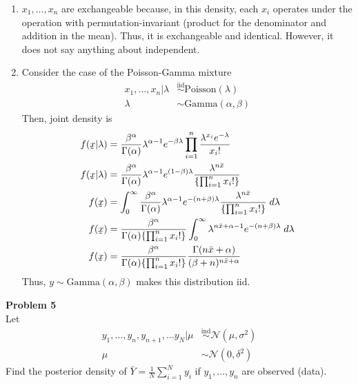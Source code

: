 \documentclass{article}
\newcommand{\ut}[1]{\underaccent{\tilde}{#1}}
\renewcommand{\vec}[1]{\ut{#1}}
\newcommand{\ind}{\stackrel{\text{ind}}{\sim}}
\newcommand{\iid}{\stackrel{\text{iid}}{\sim}}
\newcommand{\nx}{x_1,\dots,x_n}
\newcommand{\ny}{y_1,\dots,y_n}
\newcommand{\Done}[2]{\text{#1}\left({#2}\right)}
\newcommand{\Dtwo}[3]{\text{#1}\left({#2},{#3}\right)}
\begin{document}
\begin{enumerate}
    \item $\nx$ are exchangeable because, in this density, each $x_i$ operates under the operation with permutation-invariant (product for the denominator and addition in the mean). Thus, it is exchangeable and identical. However, it does not say anything about independent.
    \item Consider the case of the Poisson-Gamma mixture
    \begin{align*}
    \nx | \lambda &\iid \Done{Poisson}{\lambda}\\
    \lambda &\sim \Dtwo{Gamma}{\alpha}{\beta}
    \end{align*}
    Then, joint density is
    \begin{align*}
        f(\vec{x}|\lambda) &= \frac{\beta^{\alpha}}{\Gamma(\alpha)}\lambda^{\alpha -1}e^{-\beta \lambda} \prod_{i=1}^n \frac{\lambda^{x_i}e^{-\lambda}}{x_i!}\\
        f(\vec{x}|\lambda) &= \frac{\beta^{\alpha}}{\Gamma(\alpha)}\lambda^{\alpha -1}e^{(1-\beta)\lambda}\frac{\lambda^{n\bar{x}}}{\{\prod_{i=1}^n x_i!\}}\\
        f(\vec{x}) &= \int_{0}^{\infty} \frac{\beta^{\alpha}}{\Gamma(\alpha)}\lambda^{\alpha -1}e^{-(n+\beta)\lambda}\frac{\lambda^{n\bar{x}}}{\{\prod_{i=1}^n x_i!\}} \; d\lambda\\
        f(\vec{x}) &=  \frac{\beta^{\alpha}}{\Gamma(\alpha){\{\prod_{i=1}^n x_i!\}}} \int_{0}^{\infty}\lambda^{n\bar{x} + \alpha -1}e^{-(n+\beta)\lambda} \; d\lambda\\
        f(\vec{x}) &= \frac{\beta^{\alpha}}{\Gamma(\alpha){\{\prod_{i=1}^n x_i!\}}}\frac{\Gamma(n\bar{x} + \alpha)}{(\beta+n)^{n\bar{x}+\alpha}}
    \end{align*}
    Thus, $y\sim\Dtwo{Gamma}{\alpha}{\beta}$ makes this distribution iid.
\end{enumerate}

\vspace{\baselineskip}
\noindent
\Large{\textbf{Problem 5}}\normalsize
\\

Let 
\begin{align*}
   \ny, y_{n+1}, \dots y_N | \mu & \ind\mathcal{N}(\mu,\sigma^2)\\
    \mu &\sim \mathcal{N}(0,\delta^2)
\end{align*}
Find the posterior density of $\bar{Y} = \frac{1}{N}\sum_{i=1}^N y_i$ if $\ny$ are observed (data).
\end{document}

